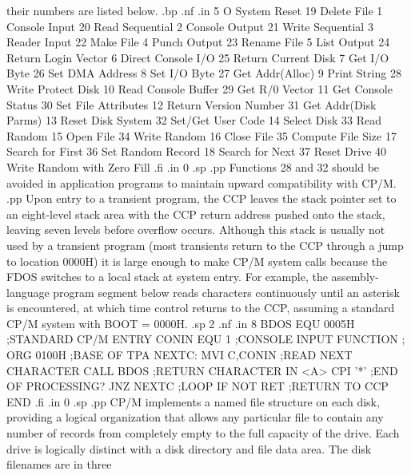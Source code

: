 their numbers are listed below.
.bp
.nf
.in 5
 O  System Reset             19  Delete File
 1  Console Input            20  Read Sequential
 2  Console Output           21  Write Sequential
 3  Reader Input             22  Make File
 4  Punch Output             23  Rename File
 5  List Output              24  Return Login Vector
 6  Direct Console I/O       25  Return Current Disk
 7  Get I/O Byte             26  Set DMA Address
 8  Set I/O Byte             27  Get Addr(Alloc)
 9  Print String             28  Write Protect Disk
10  Read Console Buffer      29  Get R/0 Vector
11  Get Console Status       30  Set File Attributes
12  Return Version Number    31  Get Addr(Disk Parms)
13  Reset Disk System        32  Set/Get User Code
14  Select Disk              33  Read Random
15  Open File                34  Write Random
16  Close File               35  Compute File Size
17  Search for First         36  Set Random Record
18  Search for Next          37  Reset Drive
                             40  Write Random with Zero Fill
.fi
.in 0
.sp
.pp
Functions 28 and 32 should be avoided in application programs to
maintain upward compatibility with CP/M.
.pp
Upon entry to a transient program, the CCP leaves the stack 
pointer set to an eight-level stack area with the CCP return 
address pushed onto the stack, leaving seven levels before 
overflow occurs.  Although this stack is usually not used by a 
transient program (most transients return to the CCP 
through a jump to location 0000H) it is large enough to 
make CP/M system calls because the FDOS switches to a local stack 
at system entry.  For example, the assembly-language program segment below 
reads characters continuously until an asterisk is 
encountered, at which time control returns to the CCP, assuming a 
standard CP/M system with BOOT = 0000H.
.sp 2
.nf
.in 8
BDOS      EQU        0005H      ;STANDARD CP/M ENTRY
CONIN     EQU        1          ;CONSOLE INPUT FUNCTION
;
          ORG        0100H      ;BASE OF TPA
NEXTC:    MVI        C,CONIN    ;READ NEXT CHARACTER
          CALL       BDOS       ;RETURN CHARACTER IN <A>
          CPI        '*'        ;END OF PROCESSING?
          JNZ        NEXTC      ;LOOP IF NOT
          RET                   ;RETURN TO CCP
          END
.fi
.in 0
.sp
.pp
CP/M implements a named file structure on each disk, providing a 
logical organization that allows any particular file to contain 
any number of records from completely empty to the full capacity 
of the drive.  Each drive is logically distinct with a disk 
directory and file data area.  The disk filenames are in three 
